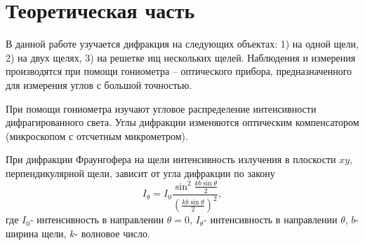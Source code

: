 
\usepackage{setspace}
\usepackage{amsmath}

\DeclareMathOperator{\sinc}{sinc}
\newcommand{\dif}[3]{


\pgfplotstablegetelem{0}{#2}\of#1

\pgfplotstablecreatecol
    [expr={\thisrow{#2} - \pgfplotsretval}]
    {LocalDistance#3}{#1}

\pgfplotstablecreatecol
    [expr={-\thisrow{LocalDistance#3} + \prevrow{LocalDistance#3}}]
    {#3}{#1}

}
\newcommand{\Exp}[1]{
	\exp\left(#1\right)
}
\newcommand{\Sinc}[1]{
	\sinc\left(#1\right)
}
\newcommand{\Sin}[1]{
	\sin\left(#1\right)
}


\def\labauthors{Понур К.А., Сарафанов Ф.Г., Сидоров Д.А.}
\def\labgroup{420}
\def\labnumber{320}
\def\labtheme{Дифракций Фраунгофера}
\renewcommand{\vec}{\mathbf}
\renewcommand{\Re}{\operatorname{Re}}
\renewcommand{\Im}{\operatorname{Im}}
\renewcommand{\phi}{\varphi}
\renewcommand{\kappa}{\varkappa}
\renewcommand{\hat}{\widehat}

\begin{spacing}{1}
\tableofcontents
\end{spacing}
\newpage
 \section{Теоретическая часть}
В данной работе узучается дифракция на следующих объектах: 1) на одной щели, 2) на двух щелях, 3) на решетке ищ нескольких щелей. Наблюдения и измерения производятся при помощи гониометра -- оптического прибора, предназначенного для измерения углов с большой точностью. 

При помощи гониометра изучают угловое распределение интенсивности дифрагированного света. Углы дифракции изменяются оптическим компенсатором (микроскопом с отсчетным микрометром).

При дифракции Фраунгофера на щели интенсивность излучения в плоскости $xy$, перпендикулярной щели, зависит от угла дифракции по закону
\begin{equation}
	I_{\theta}=I_0\frac{\sin^2\frac{kb\sin\theta}{2}}{(\frac{kb\sin\theta}{2})^2},		
\end{equation}
где $I_0$- интенсивность в направлении $\theta=0$, $I_{\theta}$- интенсивность в направлении $\theta$, $b$- ширина щели, $k$- волновое число.

